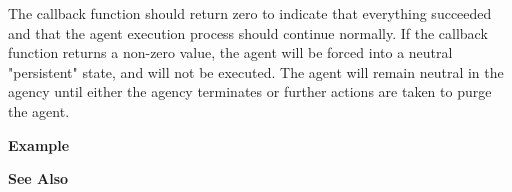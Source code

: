 The callback function should return zero to indicate that everything succeeded and that the 
agent execution process should continue normally. If the callback function returns a 
non-zero value, the agent will be forced into a neutral "persistent" state, and will
not be executed. The agent will remain neutral in the agency until either the agency terminates
or further actions are taken to purge the agent.

\noindent
{\bf Example}\\
\noindent
{\footnotesize}

\noindent
{\bf See Also}\\

